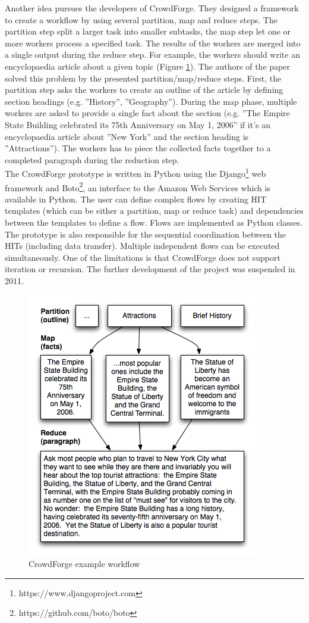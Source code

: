Another idea pursues the developers of CrowdForge\cite{crowdforge}. They designed a framework to create a workflow by using several partition, map and reduce steps. The partition step split a larger task into smaller subtasks, the map step let one or more workers process a specified task. The results of the workers are merged into a single output during the reduce step. For example, the workers should write an encyclopaedia article about a given topic (Figure \ref{crowdforgeflow}). The authors of the paper solved this problem by the presented partition/map/reduce steps. First, the partition step asks the workers to create an outline of the article by defining section headings (e.g. ''History'', ''Geography''). During the map phase, multiple workers are asked to provide a single fact about the section (e.g. ''The Empire State Building celebrated its 75th Anniversary on May 1, 2006'' if it's an encyclopaedia article about ''New York'' and the section heading is ''Attractions''). The workers has to piece the collected facts together to a completed paragraph during the reduction step.\\
The CrowdForge prototype is written in Python using the Django\footnote{https://www.djangoproject.com} web framework and Boto\footnote{https://github.com/boto/boto}, an interface to the Amazon Web Services which is available in Python. The user can define complex flows by creating HIT templates (which can be either a partition, map or reduce task) and dependencies between the templates to define a flow. Flows are implemented as Python classes. The prototype is also responsible for the sequential coordination between the HITs (including data transfer). Multiple independent flows can be executed simultaneously. One of the limitations is that CrowdForge does not support iteration or recursion. The further development of the project was suspended in 2011.
\begin{figure}
\centering
\includegraphics[scale=0.5]{images/crowdforge-article.png}
\caption{CrowdForge example workflow}
\label{crowdforgeflow}
\end{figure}

